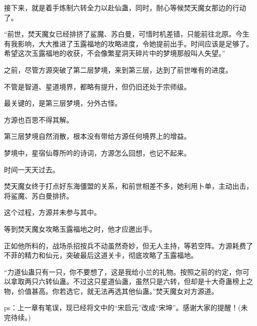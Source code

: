 \begin{this_body}
接下来，就是着手炼制六转全力以赴仙蛊，同时，耐心等候焚天魔女那边的行动了。

“前世，焚天魔女已经排挤了鲨魔、苏白曼，可惜时机差错，只能前往北原。今生有我影响，大大推进了玉露福地的攻略进度，令她提前出手。时间应该是足够了。希望这次玉露福地的收获，不会像繁星洞天碎片中的梦境那般叫人失望。”

之前，尽管方源突破了第二层梦境，来到第三层，达到了前世唯有的进度。

不管是智道、星道境界，都略有提升，但仍旧还处于宗师级。

最关键的，是第三层梦境，分外古怪。

方源也百思不得其解。

第三层梦境自然消散，根本没有带给方源任何境界上的增益。

梦境中，星宿仙尊所吟的诗词，方源怎么回想，也记不起来。

时间一天天过去。

焚天魔女终于打点好东海僵盟的关系，和前世相差不多，她利用卜单，主动出击，将鲨魔、苏白曼排挤。

这个过程，方源并未参与其中。

等到焚天魔女攻略玉露福地之时，他才应邀出手。

正如他所料的，战场杀招按兵不动虽然奇妙，但无人主持，等若空阵。方源耗费了不菲的精力和仙元，突破最后这道关卡，彻底攻略了玉露福地。

“力道仙蛊只有一只，你不要想了，这是我给小兰的礼物。按照之前的约定，你可以拿取两只六转仙蛊。不过这只星道仙蛊，虽然只是六转，但却是十大奇蛊榜上之物，价值甚高。你若选它，就无法再选其他仙蛊。”焚天魔女对方源道。

ps：上一章有笔误，现已经将文中的“宋启元”改成“宋坤”。感谢大家的提醒！(未完待续。)

\end{this_body}

